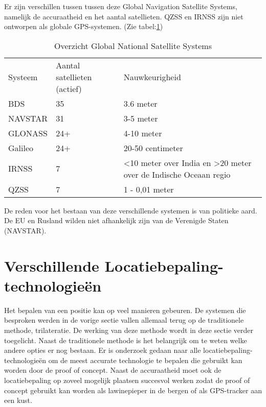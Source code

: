 Er zijn verschillen tussen tussen deze Global Navigation Satellite Systems, namelijk de accuraatheid en het aantal satellieten. QZSS en IRNSS zijn niet ontworpen als globale GPS-systemen. (Zie tabel:\ref{tab:GNSS-vergelijking})
\begin{table}[]
	\begin{tabular}{lll}
		Systeem & Aantal satellieten (actief) & Nauwkeurigheid                                                                        \\
				BDS     & 35                          & 3.6 meter                                                                      \\
		NAVSTAR & 31                          & 3-5 meter                                                                             \\
		GLONASS & 24+                         & 4-10 meter                                                                            \\
		Galileo & 24+                         & 20-50 centimeter                                                                      \\
		IRNSS   & 7                           & \textless 10 meter over India en \textgreater{}20 meter over de Indische Oceaan regio \\
		QZSS    & 7                           & 1 - 0,01 meter                                                                       
	\end{tabular}
\label{tab:GNSS-vergelijking}
\caption{Overzicht Global National Satellite Systems}
\autocite{gnss}
\end{table}
\newline
De reden voor het bestaan van deze verschillende systemen is van politieke aard. De EU en Rusland wilden niet afhankelijk zijn van de Verenigde Staten (NAVSTAR).

\section{Verschillende Locatiebepaling-technologieën}
\label{sec:Locatiebepaling-technologieën}
Het bepalen van een positie kan op veel manieren gebeuren. De systemen die besproken werden in de vorige sectie vallen allemaal terug op de traditionele methode, trilateratie. De werking van deze methode wordt in deze sectie verder toegelicht. Naast de traditionele methode is het belangrijk om te weten welke andere opties er nog bestaan. Er is onderzoek gedaan naar alle locatiebepaling-technologieën om de meest accurate technologie te bepalen die gebruikt kan worden door de proof of concept. Naast de accuraatheid moet ook de locatiebepaling op zoveel mogelijk plaatsen succesvol werken zodat de proof of concept gebruikt kan worden als lawinepieper in de bergen of als GPS-tracker aan een kust.

